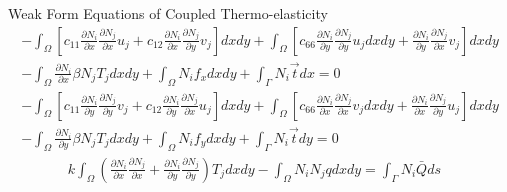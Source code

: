 \documentclass{beamer}
\begin{document}
\begin{frame}[t,fragile]{Weak Form Equations of Coupled Thermo-elasticity}
    \vspace{-.4cm}
            \scriptsize
         \begin{align*}
     -\int_{\Omega}^{}\left[ c_{11}\frac{\partial N_i}{\partial x}\frac{\partial N_j}{\partial x}u_j+c_{12}\frac{\partial N_i}{\partial x}\frac{\partial N_j}{\partial y}v_j\right]dxdy+\int_{\Omega}^{}\left[c_{66}\frac{\partial N_i}{\partial y}\frac{\partial N_j}{\partial y}u_jdxdy+\frac{\partial N_i}{\partial y}\frac{\partial N_j}{\partial x}v_j\right]dxdy\nonumber\\ -\int_{\Omega}^{}\frac{\partial N_i}{\partial x}\beta N_jT_j dxdy +\int_{\Omega}^{}N_if_x
     dxdy+\int_{\Gamma}^{}N_i\vec{t}dx=0\end{align*}
  \begin{align*}
     -\int_{\Omega}^{}\left[ c_{11}\frac{\partial N_i}{\partial y}\frac{\partial N_j}{\partial y}v_j+c_{12}\frac{\partial N_i}{\partial y}\frac{\partial N_j}{\partial x}u_j\right]dxdy+\int_{\Omega}^{}\left[c_{66}\frac{\partial N_i}{\partial x}\frac{\partial N_j}{\partial x}v_jdxdy+\frac{\partial N_i}{\partial x}\frac{\partial N_j}{\partial y}u_j\right]dxdy\nonumber\\ -\int_{\Omega}^{}\frac{\partial N_i}{\partial y}\beta N_jT_j dxdy+\int_{\Omega}^{}N_if_y dxdy+\int_{\Gamma}^{}N_i\vec{t}dy=0
 \end{align*}
  \begin{align*}
        k\int_{\Omega}\left( \frac{\partial N_i}{\partial x}\frac{\partial N_j}{\partial x}+\frac{\partial N_i}{\partial y}\frac{\partial N_j}{\partial y} \right)T_jdxdy-\int_{\Omega}^{}N_iN_jqdxdy=\int_{\Gamma}^{}N_i\bar{Q}ds& \end{align*}
\end{frame}
\end{document}
